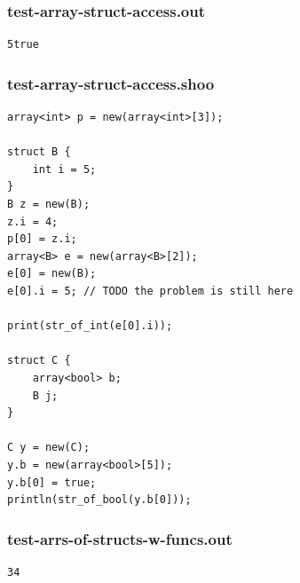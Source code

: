 \documentclass[12pt]{article}
\begin{document}
\subsubsection{test-array-struct-access.out}
\begin{mdframed}[hidealllines=true,backgroundcolor=green!10]
\begin{lstlisting}
5true
\end{lstlisting}
\end{mdframed}
\subsubsection{test-array-struct-access.shoo}
\begin{mdframed}[hidealllines=true,backgroundcolor=blue!10]
\begin{lstlisting}
array<int> p = new(array<int>[3]);

struct B {
    int i = 5;
}
B z = new(B);
z.i = 4;
p[0] = z.i;
array<B> e = new(array<B>[2]);
e[0] = new(B);
e[0].i = 5; // TODO the problem is still here

print(str_of_int(e[0].i));

struct C {
    array<bool> b; 
    B j;
}

C y = new(C);
y.b = new(array<bool>[5]);
y.b[0] = true;
println(str_of_bool(y.b[0]));
\end{lstlisting}
\end{mdframed}
\subsubsection{test-arrs-of-structs-w-funcs.out}
\begin{mdframed}[hidealllines=true,backgroundcolor=green!10]
\begin{lstlisting}
34\end{lstlisting}
\end{mdframed}
\end{document}
